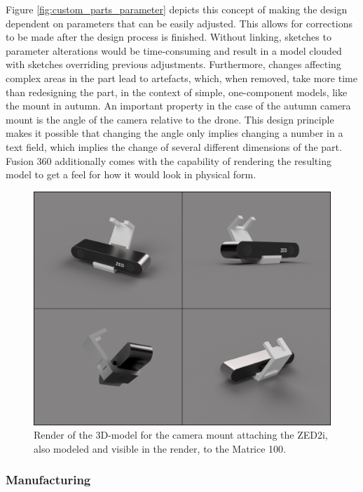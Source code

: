 Figure \ref{fig:custom_parts_parameter} depicts this concept of making the design dependent on parameters that can be easily adjusted. This allows for corrections to be made after the design process is finished. Without linking, sketches to parameter alterations would be time-consuming and result in a model clouded with sketches overriding previous adjustments. Furthermore, changes affecting complex areas in the part lead to artefacts, which, when removed, take more time than redesigning the part, in the context of simple, one-component models, like the mount in autumn. An important property in the case of the autumn camera mount is the angle of the camera relative to the drone. This design principle makes it possible that changing the angle only implies changing a number in a text field, which implies the change of several different dimensions of the part. 
Fusion 360 additionally comes with the capability of rendering the resulting model to get a feel for how it would look in physical form.

\begin{figure}[h]
	\centering
	\includegraphics[width=0.6\linewidth]{img/MountRender}
	\caption{Render of the 3D-model for the camera mount attaching the ZED2i, also modeled and visible in the render, to the Matrice 100.}
	\label{fig:custom_parts_mountRender}
\end{figure}

\subsubsection{Manufacturing}

